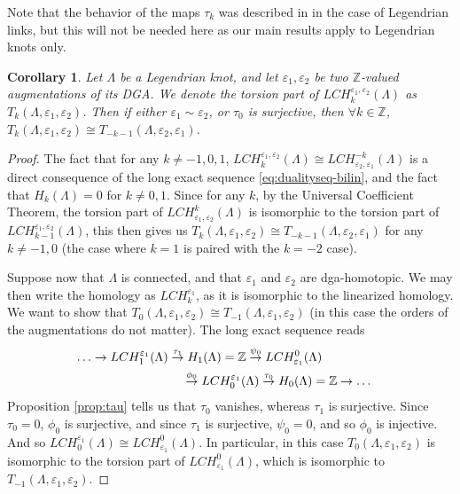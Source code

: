 \documentclass[11pt]{amsart}
\theoremstyle{plain}
\newtheorem{Cor}[defn]{Corollary}
\theoremstyle{remark}
\numberwithin{equation}{section}
\newcommand{\Z}{\ensuremath{\mathbb{Z}}}
\begin{document}
Note that the behavior of the maps $\tau_k$ was described in \cite{St} in the case of Legendrian links, but this will not be needed here as our main
results apply to Legendrian knots only.

\begin{Cor}\label{cor:torsion_iso}Let $\Lambda$ be a Legendrian knot, and let $\varepsilon_1,\varepsilon_2$ be two $\Z$-valued augmentations of its DGA. We denote the torsion part of $LCH^{\varepsilon_1,\varepsilon_2}_k(\Lambda)$ as $T_k(\Lambda,\varepsilon_1,\varepsilon_2)$. Then if either $\varepsilon_1\sim\varepsilon_2$, or $\tau_0$ is surjective, then $\forall k\in\Z$, $T_k(\Lambda, \varepsilon_1,\varepsilon_2)\cong T_{-k-1}(\Lambda, \varepsilon_2,\varepsilon_1)$. 
\end{Cor}

\begin{proof} The fact that for any $k\neq-1,0,1$, $LCH^{\varepsilon_1,\varepsilon_2}_k(\Lambda)\cong LCH^{-k}_{\varepsilon_2,\varepsilon_1}(\Lambda)$ is a direct consequence of the long exact sequence \eqref{eq:dualityseq-bilin}, and the fact that $H_k(\Lambda)=0$ for $k\neq0,1$. Since for any $k$, by the Universal Coefficient Theorem, the torsion part of $LCH^{k}_{\varepsilon_1,\varepsilon_2}(\Lambda)$ is isomorphic to the torsion part of $LCH_{k-1}^{\varepsilon_1,\varepsilon_2}(\Lambda)$, this then gives us $T_k(\Lambda, \varepsilon_1,\varepsilon_2)\cong T_{-k-1}(\Lambda, \varepsilon_2,\varepsilon_1)$ for any $k\neq-1,0$ (the case where $k=1$ is paired with the $k=-2$ case).

Suppose now that $\Lambda$ is connected, and that $\varepsilon_1$ and $\varepsilon_2$ are dga-homotopic. We may then write the homology as $LCH_k^{\varepsilon_1}$, as it is isomorphic to the linearized homology. We want to show that $T_0(\Lambda,\varepsilon_1,\varepsilon_2)\cong T_{-1}(\Lambda,\varepsilon_1,\varepsilon_2)$ (in this case the orders of the augmentations do not matter). The long exact sequence reads
 \begin{align*}
\lefteqn{\ldots \rightarrow LCH_{1}^{\varepsilon_1}(\Lambda) \overset{\tau_1}\rightarrow H_1(\Lambda) = \Z \overset{\psi_0}\rightarrow LCH^{0}_{\varepsilon_1}(\Lambda)} \\
& \hspace{3cm} \overset{\phi_0}\rightarrow LCH_{0}^{\varepsilon_1}(\Lambda) \newline \overset{\tau_0}\rightarrow H_{0}(\Lambda) = \Z\rightarrow \ldots
\end{align*}
Proposition \ref{prop:tau} tells us that $\tau_0$ vanishes, whereas $\tau_1$ is surjective. Since $\tau_0=0$, $\phi_0$ is surjective, and since $\tau_1$ is surjective, $\psi_0=0$, and so $\phi_0$ is injective. And so $LCH_{0}^{\varepsilon_1}(\Lambda)\cong LCH^{0}_{\varepsilon_1}(\Lambda)$. In particular, in this case $T_0(\Lambda, \varepsilon_1,\varepsilon_2)$ is isomorphic to the torsion part of $LCH^{0}_{\varepsilon_1}(\Lambda)$, which is isomorphic to $T_{-1}(\Lambda,\varepsilon_1,\varepsilon_2)$. 


\end{proof}
\end{document}
